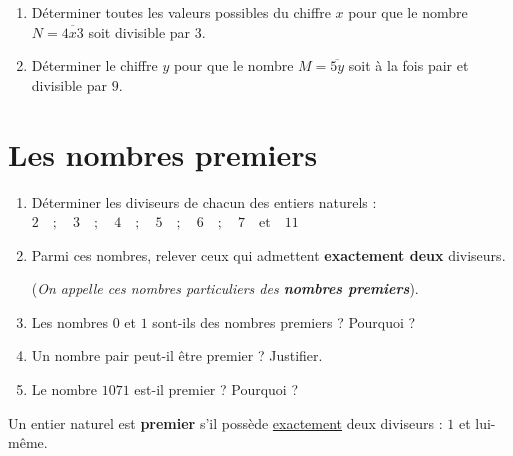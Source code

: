 \documentclass[10pt, a4paper]{article}
\begin{document}
\begin{Application}[][15 min]
\begin{enumerate}[leftmargin=*,itemsep=0.5pt]
    \item Déterminer toutes les valeurs possibles du chiffre $x$ pour que le nombre $N = \overline{4x3}$ soit divisible par $3$.
    \item Déterminer le chiffre $y$ pour que le nombre $M = \overline{5y}$ soit à la fois pair et divisible par $9$.
\end{enumerate}
\end{Application}



\section{Les nombres premiers }

\begin{Activite}[][10 min]
\begin{enumerate}[leftmargin=*,itemsep=0.5pt]
    \item Déterminer les diviseurs de chacun des entiers naturels :
    $2 \quad ; \quad 3 \quad ; \quad 4 \quad ; \quad 5 \quad ; \quad 6 \quad ; \quad 7 \quad \text{et} \quad 11$

    \item Parmi ces nombres, relever ceux qui admettent \textbf{exactement deux} diviseurs.

    (\textit{On appelle ces nombres particuliers des \textbf{nombres premiers}}).

    \item Les nombres $0$ et $1$ sont-ils des nombres premiers ? Pourquoi ?

    \item Un nombre pair peut-il être premier ? Justifier.

    \item Le nombre $1071$ est-il premier ? Pourquoi ?
\end{enumerate}
\end{Activite}

\begin{Definition}[]
Un entier naturel est \textbf{premier} s'il possède \underline{exactement} deux diviseurs : $1$ et lui-même.
\end{Definition}

\end{document}
